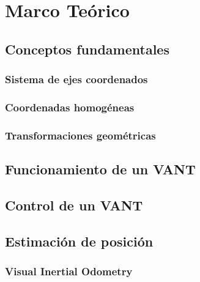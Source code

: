 \chapter{Marco Teórico}

\lipsum[2-4]


\lipsum[2-4]

\section{Conceptos fundamentales} \label{}

\lipsum[2-4]

\subsection{Sistema de ejes coordenados}

\lipsum[2-4]

\subsection{Coordenadas homogéneas}

\lipsum[2-4]

\subsection{Transformaciones geométricas}

\lipsum[2-4]

\section{Funcionamiento de un VANT}

\lipsum[2-4]

\section{Control de un VANT}

\lipsum[2-4]

\section{Estimación de posición}

\lipsum[2-4]

\subsection{Visual Inertial Odometry}

